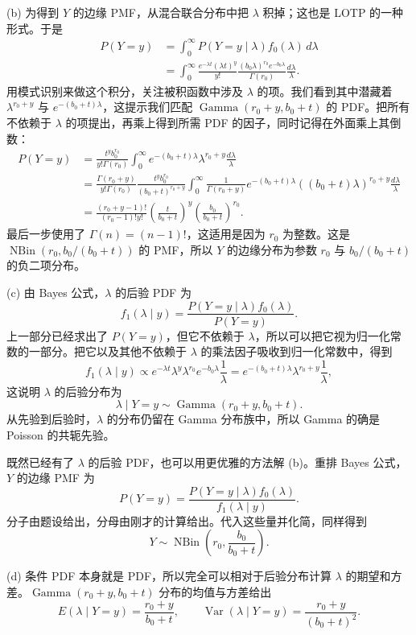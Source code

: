 \documentclass[UTF8,12pt,a4paper,fontset=fandol]{ctexart}
\begin{document}
(b) 为得到 $Y$ 的边缘 PMF，从混合联合分布中把 $\lambda$ 积掉；这也是 LOTP 的一种形式。于是
\[
\begin{aligned}
  P(Y=y)
  &=\int_0^\infty P(Y=y\mid\lambda)f_0(\lambda)\,d\lambda\\
  &=\int_0^\infty
    \frac{e^{-\lambda t}(\lambda t)^y}{y!}
    \frac{(b_0\lambda)^{r_0}e^{-b_0\lambda}}{\Gamma(r_0)}
    \frac{d\lambda}{\lambda}.
\end{aligned}
\]
用模式识别来做这个积分，关注被积函数中涉及 $\lambda$ 的项。我们看到其中潜藏着 $\lambda^{r_0+y}$ 与 $e^{-(b_0+t)\lambda}$，这提示我们匹配 $\operatorname{Gamma}(r_0+y,b_0+t)$ 的 PDF。把所有不依赖于 $\lambda$ 的项提出，再乘上得到所需 PDF 的因子，同时记得在外面乘上其倒数：
\[
\begin{aligned}
  P(Y=y)
  &=
  \frac{t^y b_0^{r_0}}{y!\Gamma(r_0)}
  \int_0^\infty e^{-(b_0+t)\lambda}\lambda^{r_0+y}\frac{d\lambda}{\lambda}\\
  &=
  \frac{\Gamma(r_0+y)}{y!\Gamma(r_0)}
  \frac{t^y b_0^{r_0}}{(b_0+t)^{r_0+y}}
  \int_0^\infty
  \frac{1}{\Gamma(r_0+y)}
  e^{-(b_0+t)\lambda}((b_0+t)\lambda)^{r_0+y}
  \frac{d\lambda}{\lambda}\\
  &=
  \frac{(r_0+y-1)!}{(r_0-1)!y!}
  \left(\frac{t}{b_0+t}\right)^y
  \left(\frac{b_0}{b_0+t}\right)^{r_0}.
\end{aligned}
\]
最后一步使用了 $\Gamma(n)=(n-1)!$，这适用是因为 $r_0$ 为整数。这是 $\operatorname{NBin}(r_0,b_0/(b_0+t))$ 的 PMF，所以 $Y$ 的边缘分布为参数 $r_0$ 与 $b_0/(b_0+t)$ 的负二项分布。

(c) 由 Bayes 公式，$\lambda$ 的后验 PDF 为
\[
  f_1(\lambda\mid y)
  =
  \frac{P(Y=y\mid \lambda)f_0(\lambda)}{P(Y=y)}.
\]
上一部分已经求出了 $P(Y=y)$，但它不依赖于 $\lambda$，所以可以把它视为归一化常数的一部分。把它以及其他不依赖于 $\lambda$ 的乘法因子吸收到归一化常数中，得到
\[
  f_1(\lambda\mid y)
  \propto e^{-\lambda t}\lambda^y\lambda^{r_0}e^{-b_0\lambda}\frac1\lambda
  =
  e^{-(b_0+t)\lambda}\lambda^{r_0+y}\frac1\lambda,
\]
这说明 $\lambda$ 的后验分布为
\[
  \lambda\mid Y=y\sim\operatorname{Gamma}(r_0+y,b_0+t).
\]
从先验到后验时，$\lambda$ 的分布仍留在 Gamma 分布族中，所以 Gamma 的确是 Poisson 的共轭先验。

既然已经有了 $\lambda$ 的后验 PDF，也可以用更优雅的方法解 (b)。重排 Bayes 公式，$Y$ 的边缘 PMF 为
\[
  P(Y=y)=\frac{P(Y=y\mid \lambda)f_0(\lambda)}{f_1(\lambda\mid y)}.
\]
分子由题设给出，分母由刚才的计算给出。代入这些量并化简，同样得到
\[
  Y\sim\operatorname{NBin}\left(r_0,\frac{b_0}{b_0+t}\right).
\]

(d) 条件 PDF 本身就是 PDF，所以完全可以相对于后验分布计算 $\lambda$ 的期望和方差。$\operatorname{Gamma}(r_0+y,b_0+t)$ 分布的均值与方差给出
\[
  E(\lambda\mid Y=y)=\frac{r_0+y}{b_0+t},
  \qquad
  \operatorname{Var}(\lambda\mid Y=y)=\frac{r_0+y}{(b_0+t)^2}.
\]
\end{document}
